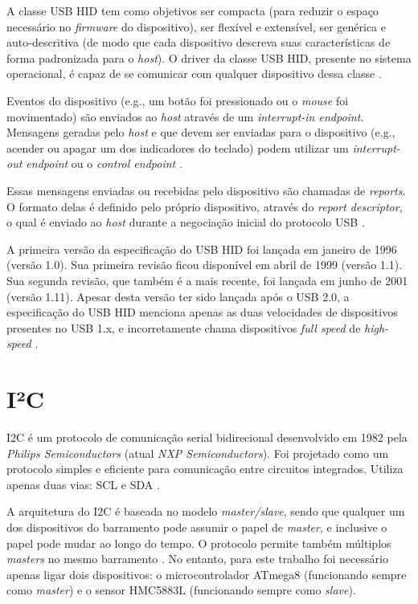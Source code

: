 \documentclass[brazil,pagestart=firstchapter]{abnt}
\makeatletter
\newcommand*{\eg}{e.g.\@\xspace}
\makeatother
\begin{document}
A classe \ac{USB} \ac{HID} tem como objetivos ser compacta (para reduzir o
espaço necessário no \textit{firmware} do dispositivo), ser flexível e
extensível, ser genérica e auto-descritiva (de modo que cada dispositivo
descreva suas características de forma padronizada para o \textit{host}). O
driver da classe \ac{USB} \ac{HID}, presente no sistema operacional, é capaz
de se comunicar com qualquer dispositivo dessa classe \cite{usbhid}.

Eventos do dispositivo (\eg, um botão foi pressionado ou o \textit{mouse}
foi movimentado) são enviados ao \textit{host} através de um
\textit{interrupt-in endpoint}. Mensagens geradas pelo \textit{host} e que
devem ser enviadas para o dispositivo (\eg, acender ou apagar um dos
indicadores do teclado) podem utilizar um \textit{interrupt-out endpoint} ou
o \textit{control endpoint} \cite{usbhid}.

Essas mensagens enviadas ou recebidas pelo dispositivo são chamadas de
\textit{reports}. O formato delas é definido pelo próprio dispositivo,
através do \textit{report descriptor}, o qual é enviado ao \textit{host}
durante a negociação inicial do protocolo \ac{USB} \cite{usbhid}.

A primeira versão da especificação do \ac{USB} \ac{HID} foi lançada em
janeiro de 1996 (versão 1.0). Sua primeira revisão ficou disponível em abril
de 1999 (versão 1.1). Sua segunda revisão, que também é a mais recente, foi
lançada em junho de 2001 (versão 1.11). Apesar desta versão ter sido lançada
após o \ac{USB} 2.0, a especificação do \ac{USB} \ac{HID} menciona apenas as
duas velocidades de dispositivos presentes no \ac{USB} 1.x, e incorretamente
chama dispositivos \textit{full speed} de \textit{high-speed}
\cite{usbhid}.


\section{I²C}
\label{sec:i2c}

\acf{I2C} é um protocolo de comunicação serial bidirecional desenvolvido em
1982 pela \textit{Philips Semiconductors} (atual \textit{NXP
Semiconductors}). Foi projetado como um protocolo simples e eficiente para
comunicação entre circuitos integrados. Utiliza apenas duas vias: \ac{SCL} e
\ac{SDA} \cite{UM10204}.

A arquitetura do \ac{I2C} é baseada no modelo \textit{master/slave}, sendo
que qualquer um dos dispositivos do barramento pode assumir o papel de
\textit{master}, e inclusive o papel pode mudar ao longo do tempo. O
protocolo permite também múltiplos \textit{masters} no mesmo barramento
\cite{UM10204} \cite{ATmega8}. No entanto, para este trabalho
foi necessário apenas ligar dois dispositivos: o microcontrolador ATmega8
(funcionando sempre como \textit{master}) e o sensor HMC5883L (funcionando
sempre como \textit{slave}).
\end{document}
